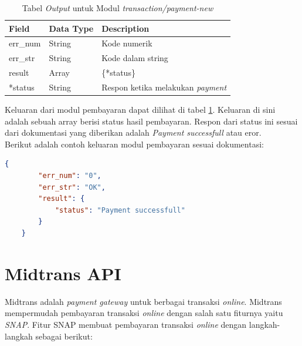 \begin{table}[H]
	\centering 
	\caption{Tabel \textit{Output} untuk Modul \textit{transaction/payment-new}}
	\label{tab:paymentoutput}
	\begin{tabular}{|l|l|p{8cm}|}
		\hline
		Field & Data Type & Description\\
		\hline

		\hline
        err\_num & String & Kode numerik\\
        \hline
        err\_str & String & Kode dalam string\\
        \hline
        result & Array & \{*status\}\\
        \hline
        \hline
        *status & String & Respon ketika melakukan \textit{payment}\\
        \hline
        
	\end{tabular} 
\end{table}

Keluaran dari modul pembayaran dapat dilihat di tabel \ref{tab:paymentoutput}. Keluaran di sini adalah sebuah array berisi status hasil pembayaran. Respon dari status ini sesuai dari dokumentasi yang diberikan adalah \textit{Payment successfull} atau eror.\\

Berikut adalah contoh keluaran modul pembayaran sesuai dokumentasi:

\begin{lstlisting}[language=json]
    {
        "err_num": "0",
        "err_str": "OK",
        "result": {
            "status": "Payment successfull"
        }
    }
\end{lstlisting}

\section{Midtrans API}
\label{sec:midtransapi} 

Midtrans adalah \textit{payment gateway} untuk berbagai transaksi \textit{online}. Midtrans mempermudah pembayaran transaksi \textit{online} dengan salah satu fiturnya yaitu \textit{SNAP}. Fitur SNAP membuat pembayaran transaksi \textit{online} dengan langkah-langkah sebagai berikut:

